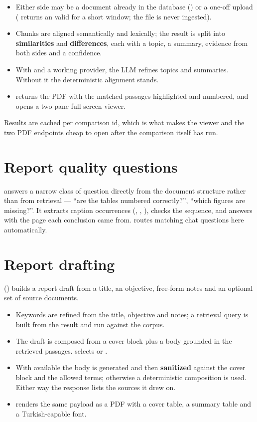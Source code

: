 \begin{itemize}
\item Either side may be a document already in the database
() or a one-off upload
( returns an  valid
for a short window; the file is never ingested).
\item Chunks are aligned semantically and lexically; the result is split into
\textbf{similarities} and \textbf{differences}, each with a topic, a summary,
evidence from both sides and a confidence.
\item With  and a working provider, the LLM refines topics and
summaries. Without it the deterministic alignment stands.
\item {} returns the PDF with the
matched passages highlighted and numbered, and
 opens a two-pane full-screen
viewer.
\end{itemize}

Results are cached per comparison id, which is what makes the viewer and the two
PDF endpoints cheap to open after the comparison itself has run.

\section{Report quality questions}

 answers a narrow class of question directly from the
document structure rather than from retrieval --- ``are the tables numbered
correctly?'', ``which figures are missing?''. It extracts caption occurrences
(, , ), checks the sequence, and
answers with the page each conclusion came from.
 routes matching chat questions here
automatically.

\section{Report drafting}

 () builds a report draft
from a title, an objective, free-form notes and an optional set of source
documents.

\begin{itemize}
\item Keywords are refined from the title, objective and notes; a retrieval query
is built from the result and run against the corpus.
\item The draft is composed from a cover block plus a body grounded in the
retrieved passages.  selects  or
.
\item With  available the body is generated and then
\textbf{sanitized} against the cover block and the allowed terms; otherwise a
deterministic composition is used. Either way the response lists the sources it
drew on.
\item {} renders the same payload as a PDF with a
cover table, a summary table and a Turkish-capable font.
\end{itemize}
